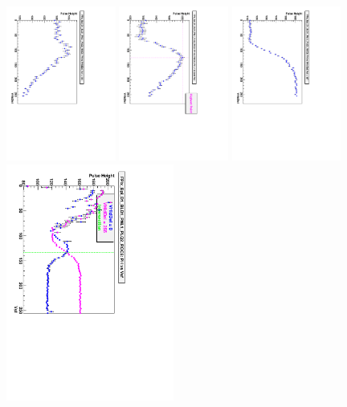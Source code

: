 \begin{figure}
\begin{center}
 \includegraphics[angle=90,width=0.32\textwidth]{PH_vs_VHldDel_Vsf119.pdf}
 \includegraphics[angle=90,width=0.32\textwidth]{PH_vs_VHldDel_Vsf136.pdf}
 \includegraphics[angle=90,width=0.32\textwidth]{PH_vs_VHldDel_Vsf187.pdf}
 \includegraphics[angle=90,width=0.49\textwidth]{PH_vs_Vsf.pdf}

\end{center}
\end{figure}

